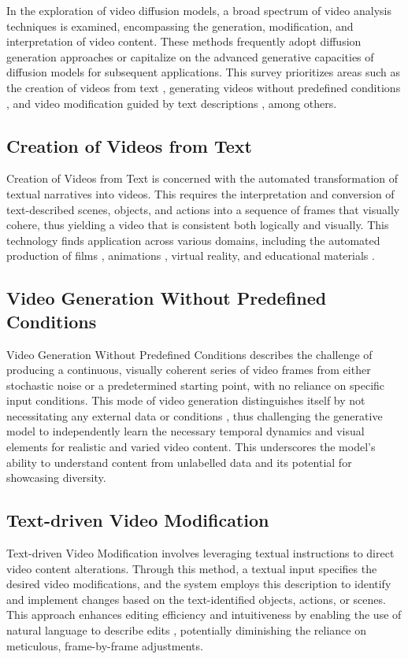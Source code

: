 In the exploration of video diffusion models, a broad spectrum of video analysis techniques is examined, encompassing the generation, modification, and interpretation of video content. These methods frequently adopt diffusion generation approaches or capitalize on the advanced generative capacities of diffusion models for subsequent applications. This survey prioritizes areas such as the creation of videos from text \cite{Singer2023MakeAV, Ho2022ImagenVH, Xing2023SimdaSA}, generating videos without predefined conditions \cite{Ho2022VideoDM, Hu2023LamdLV, Mei2023VidmVI}, and video modification guided by text descriptions \cite{Wu2023TuneAV, Esser2023StructureAC, Molad2023DreamixVD}, among others.

\subsection{Creation of Videos from Text}
Creation of Videos from Text is concerned with the automated transformation of textual narratives into videos. This requires the interpretation and conversion of text-described scenes, objects, and actions into a sequence of frames that visually cohere, thus yielding a video that is consistent both logically and visually. This technology finds application across various domains, including the automated production of films \cite{Zhu2023MoviefactoryAM}, animations \cite{He2023AnimateAS, Guo2023AnimatediffAY}, virtual reality, and educational materials \cite{Yang2023ProbabilisticAO}.

\subsection{Video Generation Without Predefined Conditions}
Video Generation Without Predefined Conditions describes the challenge of producing a continuous, visually coherent series of video frames from either stochastic noise or a predetermined starting point, with no reliance on specific input conditions. This mode of video generation distinguishes itself by not necessitating any external data or conditions \cite{Ho2022VideoDM, Hu2023LamdLV, Mei2023VidmVI}, thus challenging the generative model to independently learn the necessary temporal dynamics and visual elements for realistic and varied video content. This underscores the model's ability to understand content from unlabelled data and its potential for showcasing diversity.

\subsection{Text-driven Video Modification}
Text-driven Video Modification involves leveraging textual instructions to direct video content alterations. Through this method, a textual input specifies the desired video modifications, and the system employs this description to identify and implement changes based on the text-identified objects, actions, or scenes. This approach enhances editing efficiency and intuitiveness by enabling the use of natural language to describe edits \cite{Wu2023TuneAV, Esser2023StructureAC, Molad2023DreamixVD}, potentially diminishing the reliance on meticulous, frame-by-frame adjustments.